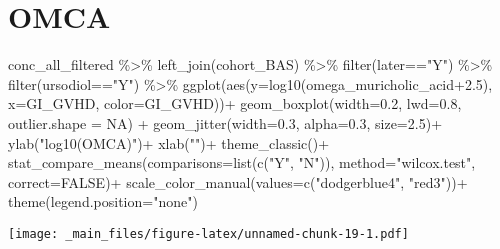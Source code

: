 \documentclass[
]{book}
\newenvironment{Shaded}{\begin{snugshade}}{\end{snugshade}}
\newcommand{\AttributeTok}[1]{\textcolor[rgb]{0.77,0.63,0.00}{#1}}
\newcommand{\ConstantTok}[1]{\textcolor[rgb]{0.00,0.00,0.00}{#1}}
\newcommand{\FloatTok}[1]{\textcolor[rgb]{0.00,0.00,0.81}{#1}}
\newcommand{\FunctionTok}[1]{\textcolor[rgb]{0.00,0.00,0.00}{#1}}
\newcommand{\NormalTok}[1]{#1}
\newcommand{\SpecialCharTok}[1]{\textcolor[rgb]{0.00,0.00,0.00}{#1}}
\newcommand{\StringTok}[1]{\textcolor[rgb]{0.31,0.60,0.02}{#1}}
\begin{document}
\hypertarget{omca}{%
\section{OMCA}\label{omca}}

\begin{Shaded}
\begin{Highlighting}[]
\NormalTok{conc\_all\_filtered }\SpecialCharTok{\%\textgreater{}\%} 
  \FunctionTok{left\_join}\NormalTok{(cohort\_BAS) }\SpecialCharTok{\%\textgreater{}\%} 
  \FunctionTok{filter}\NormalTok{(later}\SpecialCharTok{==}\StringTok{"Y"}\NormalTok{) }\SpecialCharTok{\%\textgreater{}\%} 
  \FunctionTok{filter}\NormalTok{(ursodiol}\SpecialCharTok{==}\StringTok{"Y"}\NormalTok{) }\SpecialCharTok{\%\textgreater{}\%} 
  \FunctionTok{ggplot}\NormalTok{(}\FunctionTok{aes}\NormalTok{(}\AttributeTok{y=}\FunctionTok{log10}\NormalTok{(omega\_muricholic\_acid}\FloatTok{+2.5}\NormalTok{), }\AttributeTok{x=}\NormalTok{GI\_GVHD, }\AttributeTok{color=}\NormalTok{GI\_GVHD))}\SpecialCharTok{+}
  \FunctionTok{geom\_boxplot}\NormalTok{(}\AttributeTok{width=}\FloatTok{0.2}\NormalTok{, }\AttributeTok{lwd=}\FloatTok{0.8}\NormalTok{, }\AttributeTok{outlier.shape =} \ConstantTok{NA}\NormalTok{) }\SpecialCharTok{+}
  \FunctionTok{geom\_jitter}\NormalTok{(}\AttributeTok{width=}\FloatTok{0.3}\NormalTok{, }\AttributeTok{alpha=}\FloatTok{0.3}\NormalTok{, }\AttributeTok{size=}\FloatTok{2.5}\NormalTok{)}\SpecialCharTok{+}
  \FunctionTok{ylab}\NormalTok{(}\StringTok{"log10(OMCA)"}\NormalTok{)}\SpecialCharTok{+}
  \FunctionTok{xlab}\NormalTok{(}\StringTok{""}\NormalTok{)}\SpecialCharTok{+}
  \FunctionTok{theme\_classic}\NormalTok{()}\SpecialCharTok{+}
  \FunctionTok{stat\_compare\_means}\NormalTok{(}\AttributeTok{comparisons=}\FunctionTok{list}\NormalTok{(}\FunctionTok{c}\NormalTok{(}\StringTok{"Y"}\NormalTok{, }\StringTok{"N"}\NormalTok{)),}
                     \AttributeTok{method=}\StringTok{"wilcox.test"}\NormalTok{,}
                     \AttributeTok{correct=}\ConstantTok{FALSE}\NormalTok{)}\SpecialCharTok{+}
  \FunctionTok{scale\_color\_manual}\NormalTok{(}\AttributeTok{values=}\FunctionTok{c}\NormalTok{(}\StringTok{"dodgerblue4"}\NormalTok{, }\StringTok{"red3"}\NormalTok{))}\SpecialCharTok{+}
  \FunctionTok{theme}\NormalTok{(}\AttributeTok{legend.position=}\StringTok{"none"}\NormalTok{)}
\end{Highlighting}
\end{Shaded}

\texttt{[image: \_main\_files/figure-latex/unnamed-chunk-19-1.pdf]}
\end{document}
